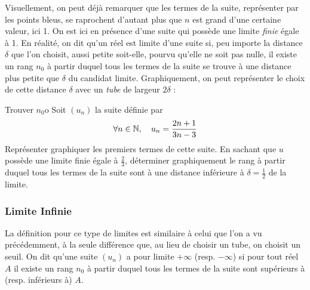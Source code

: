 Visuellement, on peut déjà remarquer que les termes de la suite, représenter par les points bleus, se raprochent d'autant plus que $n$ est grand d'une certaine valeur, ici 1. On est ici en présence d'une suite qui possède une limite \textit{finie} égale à 1. En réalité, on dit qu'un réel est limite d'une suite si, peu importe la distance $\delta$ que l'on choisit, aussi petite soit-elle, pourvu qu'elle ne soit pas nulle, il existe un rang $n_0$ à partir duquel tous les termes de la suite se trouve à une distance plus petite que $\delta$ du candidat limite. Graphiquement, on peut représenter le choix de cette distance $\delta$ avec un \textit{tube} de largeur $2\delta$ :

\begin{center}
\end{center}

\begin{exemple}{Trouver $n_0$}{o}
	Soit $(u_n)$ la suite définie par \[\forall n\in\mathbb{N},\quad u_n=\frac{2n+1}{3n-3}\]
	Représenter graphiquer les premiers termes de cette suite. En sachant que $u$ possède une limite finie égale à $\frac23$, déterminer graphiquement le rang à partir duquel tous les termes de la suite sont à une distance inférieure à $\delta=\frac12$ de la limite. 
\end{exemple}

\subsubsection{Limite Infinie}
La définition pour ce type de limites est similaire à celui que l'on a vu précédemment, à la seule différence que, au lieu de choisir un tube, on choisit un seuil. On dit qu'une suite $(u_n)$ a pour limite $+\infty$ (resp. $-\infty$) si pour tout réel $A$ il existe un rang $n_0$ à partir duquel tous les termes de la suite sont supérieurs à (resp. inférieurs à) $A$.

